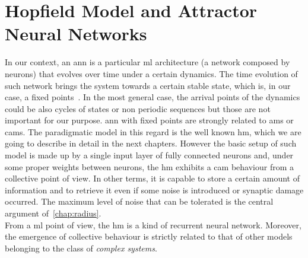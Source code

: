 \documentclass[\rootdir/main.tex]{subfiles}
\begin{document}
\section*{Hopfield Model and Attractor Neural Networks}
In our context, an \acrlong{ann} is a particular \acrlong{ml} architecture (\ie a network composed by neurons) that evolves over time under a certain dynamics. The time evolution of such network brings the system towards a certain stable state, which is, in our case, a fixed points~\cite{amit_1989}. In the most general case, the arrival points of the dynamics could be also cycles of states or non periodic sequences but those are not important for our purpose. 
\acrlong{ann} with fixed points are strongly related to \glspl{am} or \glspl{cam}.
The paradigmatic model in this regard is the well known \acrlong{hm}, which we are going to describe in detail in the next chapters. However the basic setup of such model is made up by a single input layer of fully connected neurons and, under some proper weights between neurons, the \acrlong{hm} exhibits a \acrlong{cam} behaviour from a collective point of view. In other terms, it is capable to store a certain amount of information and to retrieve it even if some noise is introduced or synaptic damage occurred. The maximum level of noise that can be tolerated is the central argument of~\cref{chap:radius}.\\
From a \acrlong{ml} point of view, the \acrlong{hm} is a kind of recurrent neural network. Moreover, the emergence of collective behaviour is strictly related to that of other models belonging to the class of \emph{complex systems}.
\end{document}
